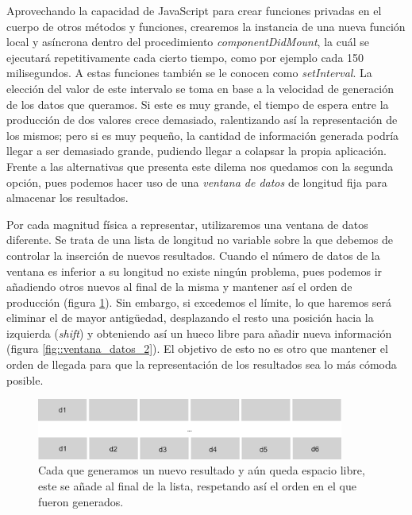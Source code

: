 \documentclass[../main.tex]{subfiles}
\begin{document}
Aprovechando la capacidad de JavaScript para crear funciones privadas en el cuerpo de otros métodos y funciones, crearemos la instancia de una nueva función local y asíncrona dentro del procedimiento \textit{componentDidMount}, la cuál se ejecutará repetitivamente cada cierto tiempo, como por ejemplo cada 150 milisegundos. A estas funciones también se le conocen como \textit{setInterval}. La elección del valor de este intervalo se toma en base a la velocidad de generación de los datos que queramos. Si este es muy grande, el tiempo de espera entre la producción de dos valores crece demasiado, ralentizando así la representación de los mismos; pero si es muy pequeño, la cantidad de información generada podría llegar a ser demasiado grande, pudiendo llegar a colapsar la propia aplicación. Frente a las alternativas que presenta este dilema nos quedamos con la segunda opción, pues podemos hacer uso de una \textit{ventana de datos} de longitud fija para almacenar los resultados.

Por cada magnitud física a representar, utilizaremos una ventana de datos diferente. Se trata de una lista de longitud no variable sobre la que debemos de controlar la inserción de nuevos resultados. Cuando el número de datos de la ventana es inferior a su longitud no existe ningún problema, pues podemos ir añadiendo otros  nuevos al final de la misma y mantener así el orden de producción (figura \ref{fig::ventana_datos_1}). Sin embargo, si excedemos el límite, lo que haremos será eliminar el de mayor antigüedad, desplazando el resto una posición hacia la izquierda (\textit{shift}) y obteniendo así un hueco libre para añadir nueva información (figura \ref{fig::ventana_datos_2}). El objetivo de esto no es otro que mantener el orden de llegada para que la representación de los resultados sea lo más cómoda posible. \\


\begin{figure}[!h]
    \centering
    \includegraphics[width=0.9\textwidth]{images/ventana_datos_1.png}
    \caption{Cada que generamos un nuevo resultado y aún queda espacio libre, este se añade al final de la lista, respetando así el orden en el que fueron generados.}
    \label{fig::ventana_datos_1}
\end{figure}
\end{document}
